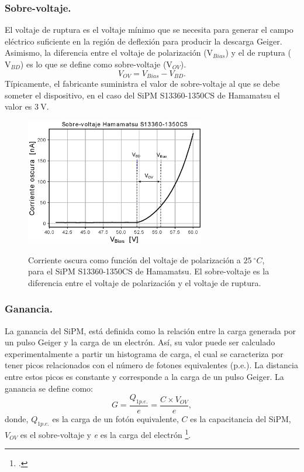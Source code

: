 \subsubsection{Sobre-voltaje.}
El voltaje de ruptura es el voltaje mínimo que se necesita para generar el campo eléctrico suficiente en la región de deflexión  para producir la descarga Geiger. Asimismo, la diferencia entre el voltaje de polarización ($\mbox{V}_{Bias}$) y el de ruptura ($\mbox{V}_{BD}$) es lo que se define como sobre-voltaje ($\mbox{V}_{OV}$).
\begin{equation}
V_{OV} = V_{Bias}-V_{BD}.
\label{Vbd_equation}    
\end{equation}
Típicamente, el fabricante suministra el valor de sobre-voltaje al que se debe someter el dispositivo, en el caso del SiPM S13360-1350CS de Hamamatsu el valor es $ 3~\mbox{V}$.
\begin{figure}[h!]
\begin{centering}
    \caption{Corriente oscura como función del voltaje de polarización a $25~^\circ C$, para el SiPM  S13360-1350CS de Hamamatsu. El sobre-voltaje es la diferencia entre el voltaje de polarización y el voltaje de ruptura.}
  \includegraphics[width=0.7\textwidth]{Images/overvoltaje.eps}
    \label{fig:Overvoltage}  
  \par\end{centering}
\end{figure}
\subsubsection{Ganancia.}
La ganancia del SiPM, está definida como la relación entre la carga generada por un pulso Geiger y la carga de un electrón. Así, su valor puede ser calculado experimentalmente a partir un histograma de carga, el cual se caracteriza por tener picos relacionados con el número de fotones equivalentes (p.e.). La distancia entre estos picos es constante  y corresponde a la carga de un pulso  Geiger. La ganancia se define como: %
\begin{equation}
    G=\frac{Q_{1p.e.}}{e} = \frac{C\times V_{OV}}{e},
    \label{Gain_eq}
\end{equation}
donde, $Q_{1p.e.}$ es la carga de un fotón equivalente, $C$ es la capacitancia del SiPM, $V_{OV}$ es el sobre-voltaje y \textit{e} es la carga del electrón \footcite{Intro_SIPM_Sensl}.
